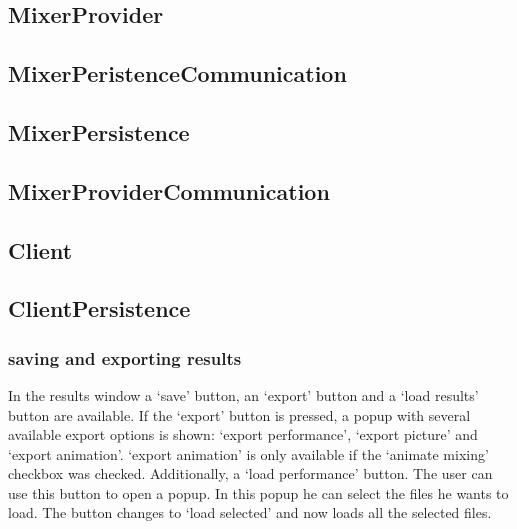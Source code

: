 \subsection{MixerProvider}

\subsection{MixerPeristenceCommunication}

\subsection{MixerPersistence}

\subsection{MixerProviderCommunication}

\subsection{Client}

\subsection{ClientPersistence}

\subsubsection{saving and exporting results}
In the results window a `save' button, an `export' button and a `load results' button are available. If the `export' button is pressed, a popup with several available export options is shown: `export performance', `export picture' and `export animation'. `export animation' is only available if the `animate mixing' checkbox was checked. Additionally, a `load performance' button. The user can use this button to open a popup. In this popup he can select the files he wants to load. The button changes to `load selected' and now loads all the selected files.




